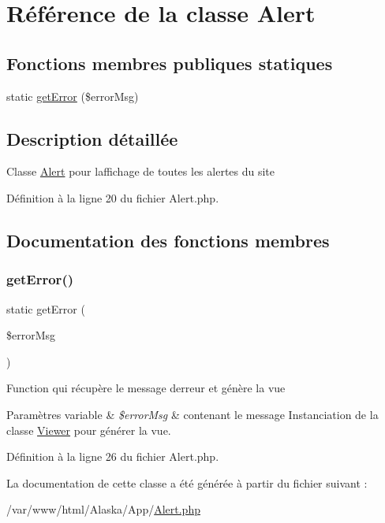 \hypertarget{class_app_1_1_alert}{}\section{Référence de la classe Alert}
\label{class_app_1_1_alert}
\subsection*{Fonctions membres publiques statiques}
\begin{DoxyCompactItemize}
\item 
static \hyperlink{class_app_1_1_alert_a9e9e1b0e1f542b18ea01e9f132a278e2}{get\+Error} (\$error\+Msg)
\end{DoxyCompactItemize}


\subsection{Description détaillée}
Classe \hyperlink{class_app_1_1_alert}{Alert} pour l\textquotesingle{}affichage de toutes les alertes du site 

Définition à la ligne 20 du fichier Alert.\+php.



\subsection{Documentation des fonctions membres}
\mbox{\label{class_app_1_1_alert_a9e9e1b0e1f542b18ea01e9f132a278e2}} 
\subsubsection{\texorpdfstring{get\+Error()}{getError()}}
{\footnotesize\ttfamily static get\+Error (\begin{DoxyParamCaption}\item[{}]{\$error\+Msg }\end{DoxyParamCaption})\hspace{0.3cm}{\ttfamily [static]}}

Function qui récupère le message d\textquotesingle{}erreur et génère la vue 
\begin{DoxyParams}[1]{Paramètres}
variable & {\em \$error\+Msg} & contenant le message Instanciation de la classe \hyperlink{class_app_1_1_viewer}{Viewer} pour générer la vue. \\
\hline
\end{DoxyParams}


Définition à la ligne 26 du fichier Alert.\+php.



La documentation de cette classe a été générée à partir du fichier suivant \+:\begin{DoxyCompactItemize}
\item 
/var/www/html/\+Alaska/\+App/\hyperlink{_alert_8php}{Alert.\+php}\end{DoxyCompactItemize}
